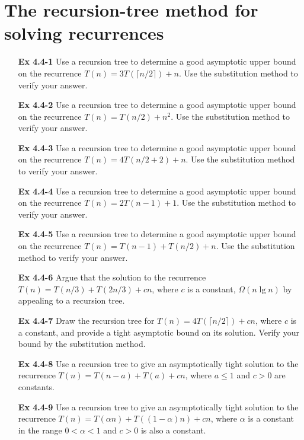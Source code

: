 \documentclass[fontsize=12pt,paper=a4]{book}
\begin{document}
\section{The recursion-tree method for solving recurrences}
\begin{enumerate}
 \item[\textbf{Ex 4.4-1}]
       Use a recursion tree to determine a good asymptotic upper bound on the recurrence $T(n) = 3T(\lceil n/2 \rceil) + n$. Use the substitution method to verify your answer.
       
 \item[\textbf{Ex 4.4-2}]
       Use a recursion tree to determine a good asymptotic upper bound on the recurrence $T(n) = T(n/2) + n^2$. Use the substitution method to verify your answer.
       
 \item[\textbf{Ex 4.4-3}]
       Use a recursion tree to determine a good asymptotic upper bound on the recurrence $T(n) = 4T(n/2+2) + n$. Use the substitution method to verify your answer.
       
 \item[\textbf{Ex 4.4-4}]
       Use a recursion tree to determine a good asymptotic upper bound on the recurrence $T(n) = 2T(n-1) + 1$. Use the substitution method to verify your answer.
       
 \item[\textbf{Ex 4.4-5}]
       Use a recursion tree to determine a good asymptotic upper bound on the recurrence $T(n) = T(n-1) + T(n/2) + n$. Use the substitution method to verify your answer.
       
 \item[\textbf{Ex 4.4-6}]
       Argue that the solution to the recurrence $T(n) = T(n/3) + T(2n/3) + cn$, where $c$ is a constant, $\Omega(n \lg n)$ by appealing to a recursion tree.
       
 \item[\textbf{Ex 4.4-7}]
       Draw the recursion tree for $T(n) = 4T(\lceil n/2 \rceil) + cn$, where $c$ is a constant, and provide a tight asymptotic bound on its solution. Verify your bound by the substitution method.
       
 \item[\textbf{Ex 4.4-8}]
       Use a recursion tree to give an asymptotically tight solution to the recurrence $T(n) = T(n-a) + T(a) + cn$, where $a \leq 1$ and $c> 0$ are constants.
       
 \item[\textbf{Ex 4.4-9}]
       Use a recursion tree to give an asymptotically tight solution to the recurrence $T(n) = T(\alpha n) + T((1 - \alpha)n) + cn$, where $\alpha$ is a constant in the range $0< \alpha <1$ and $c > 0$ is also a constant.
\end{enumerate}
\end{document}
